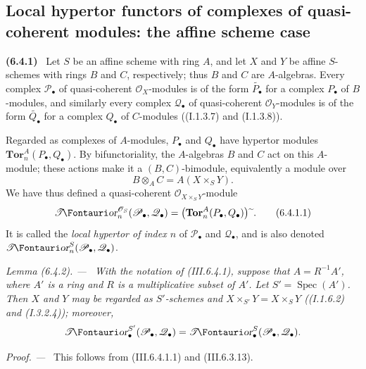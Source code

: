 \documentclass[10pt,oneside]{book}
\newcommand{\sh}[1]{\mathscr{#1}}
\newcommand{\shTor}{\sh{T}\textup{\kern-2.2pt{\Fontauri\slshape or}}}
\newcommand{\supertilde}{{\,\widetilde{\,}\,}}
\newcommand{\Spec}{\operatorname{Spec}}
\newcommand{\sref}[2][]{(#2)}
\newenvironment{env}[1][]{\par\medskip\noindent\textbf{(#1)}\ }{\par}
\newenvironment{lemma}[1][]{\par\medskip\noindent\itshape Lemma (#1). ---\ }{\par}
\newenvironment{proof}{\par\medskip\noindent\textit{Proof. ---\ }}{\par}
\begin{document}
\subsection{Local hypertor functors of complexes of quasi-coherent modules: the affine scheme case}
\label{subsection:III.6.4}
\label{III.6.4}

\begin{env}[6.4.1]
\label{III.6.4.1}
Let $S$ be an affine scheme with ring $A$, and let $X$ and $Y$ be
affine $S$-schemes with rings $B$ and $C$, respectively; thus $B$
and $C$ are $A$-algebras.  Every complex $\sh P_\bullet$ of
quasi-coherent $\sh O_X$-modules is of the form
$\widetilde{P_\bullet}$ for a complex $P_\bullet$ of $B$-modules,
and similarly every complex $\sh Q_\bullet$ of quasi-coherent
$\sh O_Y$-modules is of the form $\widetilde{Q_\bullet}$ for a
complex $Q_\bullet$ of $C$-modules
(\sref[I]{I.1.3.7} and \sref[I]{I.1.3.8}).

Regarded as complexes of $A$-modules, $P_\bullet$ and $Q_\bullet$
have hypertor modules
$\mathbf{Tor}_n^A(P_\bullet,Q_\bullet)$.  By bifunctoriality, the
$A$-algebras $B$ and $C$ act on this $A$-module; these actions make
it a $(B,C)$-bimodule, equivalently a module over
\[
  B\otimes_AC=A(X\times_SY).
\]
We have thus defined a quasi-coherent
$\sh O_{X\times_SY}$-module
\[
  \shTor_n^{\sh O_S}(\sh P_\bullet,\sh Q_\bullet)
  =
  \bigl(\mathbf{Tor}_n^A(P_\bullet,Q_\bullet)\bigr)\supertilde.
  \tag{6.4.1.1}\label{III.6.4.1.1}
\]
It is called the \emph{local hypertor of index $n$} of
$\sh P_\bullet$ and $\sh Q_\bullet$, and is also denoted
$\shTor_n^S(\sh P_\bullet,\sh Q_\bullet)$.
\end{env}

\begin{lemma}[6.4.2]
\label{III.6.4.2}
With the notation of \sref{III.6.4.1}, suppose that
$A=R^{-1}A'$, where $A'$ is a ring and $R$ is a multiplicative
subset of $A'$.  Let $S'=\Spec(A')$.  Then $X$ and $Y$ may be
regarded as $S'$-schemes and
$X\times_{S'}Y=X\times_SY$
(\sref[I]{I.1.6.2} and \sref[I]{I.3.2.4}); moreover,
\[
  \shTor_\bullet^{S'}(\sh P_\bullet,\sh Q_\bullet)
  =
  \shTor_\bullet^S(\sh P_\bullet,\sh Q_\bullet).
\]
\end{lemma}

\begin{proof}
This follows from \sref{III.6.4.1.1} and \sref{III.6.3.13}.
\end{proof}
\end{document}
